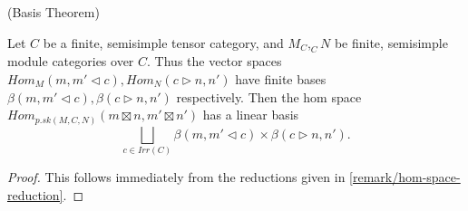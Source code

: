 \begin{proposition} (Basis Theorem) \label{proposition/basis-theorem}

  \noindent Let $C$ be a finite, semisimple tensor category, and $M_{C},
  _{C}N$ be finite, semisimple module categories over $C$. \quad Thus the
  vector spaces $Hom_{M}(m, m' \lhd c), Hom_{N}(c \rhd n, n')$ have finite
  bases $\beta(m, m' \lhd c), \beta(c \rhd n, n')$ respectively. \quad Then
  the hom space $Hom_{p.sk(M,C,N)}(m \boxtimes n, m' \boxtimes n')$ has a
  linear basis
  \[
    \bigsqcup_{c \in Irr(C)} \beta(m, m' \lhd c) \times \beta(c \rhd n, n').
  \]
\end{proposition}

\begin{proof}
  This follows immediately from the reductions given in
  \ref{remark/hom-space-reduction}.
\end{proof}


%
